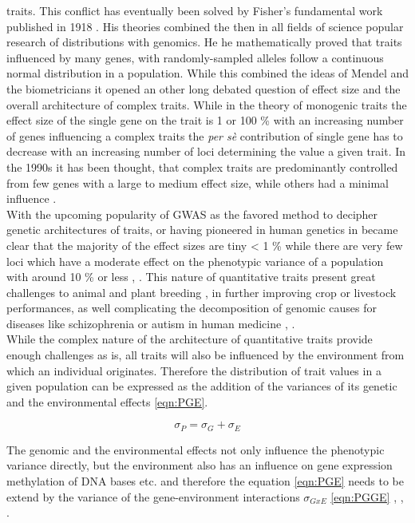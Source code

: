 traits. This conflict has eventually been solved by Fisher's fundamental work published in 1918
\cite{fisher1919xv}. His theories combined the then in all fields of science popular research of distributions
with genomics. He he mathematically proved that traits influenced by many genes, with randomly-sampled alleles
follow a continuous normal distribution in a population. While this combined the ideas of Mendel and the
biometricians it opened an other long debated question of effect size and the overall architecture of complex
traits. While in the theory of monogenic traits the effect size of the single gene on the trait is 1 or 100 \%
with an increasing number of genes influencing a complex traits the \textit{per sè} contribution of single
gene has to decrease with an increasing number of loci determining the value a given trait. In the 1990s it
has been thought, that complex traits are predominantly controlled from few genes with a large to medium
effect size, while others had a minimal influence
\cite{zhang2018esti}. \\
With the upcoming popularity of GWAS as the favored method to decipher genetic architectures of traits, or
having pioneered in human genetics in became clear that the majority of the effect sizes are tiny < 1 \% while
there are very few loci which have a moderate effect on the phenotypic variance of a population with around 10
\% or less \cite{korte2013advantages}, \cite{stringer2011}. This nature of quantitative traits present great
challenges to animal \cite{goddard2009} and plant breeding \cite{wurschum2012}, in further improving crop or
livestock performances, as well complicating the decomposition of genomic causes for diseases like
schizophrenia or autism in human medicine \cite{de2014}, \cite{purcell2014}. \\
While the complex nature of the architecture of quantitative traits provide enough challenges as is, all
traits will also be influenced by the environment from which an individual originates. Therefore the
distribution of trait values in a given population can be expressed as the addition of the variances of its
genetic and the environmental effects \ref{eqn:PGE}.

\begin{equation}
 \sigma_{P} = \sigma_{G} + \sigma_{E}
 \label{eqn:PGE}
\end{equation}

The genomic and the environmental effects not only influence the phenotypic variance directly, but the
environment also has an influence on gene expression methylation of DNA bases etc. and therefore the equation
\ref{eqn:PGE} needs to be extend by the variance of the gene-environment interactions $\sigma_{GxE}$
\ref{eqn:PGGE} , \cite{lynch1998}, \cite{walsh2018}.
    

